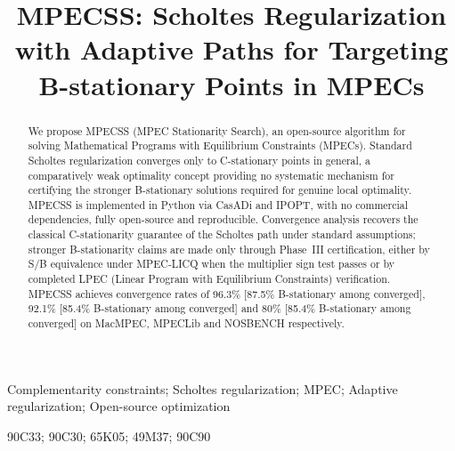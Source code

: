 \documentclass[]{interact}
\theoremstyle{plain}
\theoremstyle{definition}
\theoremstyle{remark}
\begin{document}
\title{MPECSS: Scholtes Regularization with Adaptive Paths for Targeting B-stationary Points in MPECs}

\author{
}

\maketitle



\begin{abstract}
We propose MPECSS (MPEC Stationarity Search), an open-source algorithm for solving Mathematical Programs with Equilibrium Constraints (MPECs). Standard Scholtes regularization converges only to C-stationary points in general, a comparatively weak optimality concept providing no systematic mechanism for certifying the stronger B-stationary solutions required for genuine local optimality. MPECSS is implemented in Python via CasADi and IPOPT, with no commercial dependencies, fully open-source and reproducible. Convergence analysis recovers the classical C-stationarity guarantee of the Scholtes path under standard assumptions; stronger B-stationarity claims are made only through Phase~III certification, either by S/B equivalence under MPEC-LICQ when the multiplier sign test passes or by completed LPEC (Linear Program with Equilibrium Constraints) verification. MPECSS achieves convergence rates of 96.3\% [87.5\%  B-stationary among converged], 92.1\% [85.4\% B-stationary among converged] and 80\% [85.4\% B-stationary among converged] on MacMPEC, MPECLib and NOSBENCH respectively.
\end{abstract}

\begin{keywords}
Complementarity constraints; Scholtes regularization; MPEC; Adaptive regularization; Open-source optimization
\end{keywords}

\begin{amscode}
90C33; 90C30; 65K05; 49M37; 90C90
\end{amscode}
\end{document}
